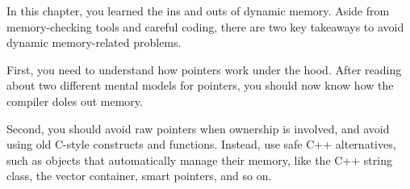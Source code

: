 In this chapter, you learned the ins and outs of dynamic memory. Aside from memory-checking tools and careful coding, there are two key takeaways to avoid dynamic memory-related problems.

First, you need to understand how pointers work under the hood. After reading about two different mental models for pointers, you should now know how the compiler doles out memory.

Second, you should avoid raw pointers when ownership is involved, and avoid using old C-style constructs and functions. Instead, use safe C++ alternatives, such as objects that automatically manage their memory, like the C++ string class, the vector container, smart pointers, and so on.
